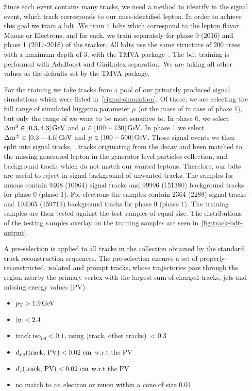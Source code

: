 Since each event contains many tracks, we need a method to identify in the signal event, which track corresponds to our miss-identified lepton. In order to achieve this goal we train a \gls{bdt}. We train 4 \glspl{bdt} which correspond to the lepton flavor, Muons or Electrons, and for each, we train separately for phase 0 (2016) and phase 1 (2017-2018) of the tracker. All \glspl{bdt} use the same structure of 200 trees with a maximum depth of 3, with the TMVA package~\cite{tmva}. The \gls{bdt} training is performed with AdaBoost and GiniIndex separation. We are taking all other values as the defaults set by the TMVA package.

For the training we take tracks from a pool of our privately produced \FASTSIM signal simulations which were listed in~\ref{signal-simulation}. Of those, we are selecting the full range of simulated higgsino parameter $\mu$ (or the mass of \PSGcpmDo in case of phase 1), but only the range of \dm we want to be most sensitive to. In phase 0, we select $\Delta\mathrm{m}^0\in [0.3,4.3]\,\text{Ge\hspace{-.08em}V}$ and $\mu\in [100-130]\,\text{Ge\hspace{-.08em}V}$. In phase 1 we select $\Delta\mathrm{m}^\pm \in [0.3-4.6]\,\text{Ge\hspace{-.08em}V}$ and $\mu\in [100-500]\,\text{Ge\hspace{-.08em}V}$. Those signal events we then split into signal tracks, \ie, tracks originating from the decay \neuttdecay and been matched to the missing generated lepton in the generator level particles collection, and background tracks which do not match our wanted leptons. Therefore, our \glspl{bdt} are useful to reject in-signal background of unwanted tracks. The samples for muons contain 9408 (10964) signal tracks and 99996 (151380) background tracks for phase 0 (phase 1). For electrons the samples contain 2364 (2288) signal tracks and 104065 (159713) background tracks for phase 0 (phase 1). The training samples are then tested against the test samples of equal size. The distributions of the testing samples overlay on the training samples are seen in~\ref{fig:track-bdt-output}.

A pre-selection is applied to all tracks in the collection obtained by the standard track reconstruction sequences. The pre-selection ensures a set of properly-reconstructed, isolated and prompt tracks, whose trajectories pass through the region nearby the primary vertex with the largest sum of charged-tracks, jets and missing energy values (PV): 

\begin{itemize}
\item $ p_{\mathrm{T}} > 1.9 \,\text{Ge\hspace{-.08em}V}$
\item $ \lvert \eta \rvert < 2.4$
\item track $\text{iso}_\text{rel}  < 0.1$, using \DR(track, other tracks) $< 0.3$
\item $d_{xy}(\text{track, PV}) < 0.02\, \,\text{cm}$ w.r.t the PV
\item $d_z(\text{track, PV}) < 0.02\, \,\text{cm}$ w.r.t the PV
\item no match to an electron or muon within a cone of size 0.01
\end{itemize}


